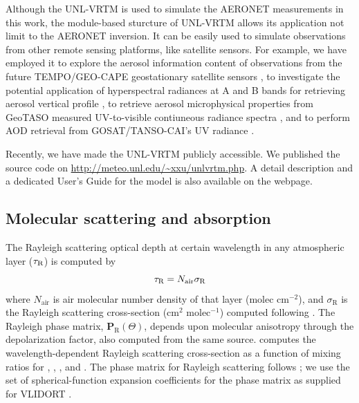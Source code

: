 Although the UNL-VRTM is used to simulate the AERONET measurements in
this work, the module-based sturcture of UNL-VRTM allows its application 
not limit to the AERONET inversion. 
It can be easily used to simulate observations
from other remote sensing platforms, like satellite sensors. For
example, we have employed it to explore the aerosol information content
of observations from the future TEMPO/GEO-CAPE geostationary satellite
sensors \citep{Wang14}, to investigate the potential application of
hyperspectral radiances at A and B bands for retrieving
aerosol vertical profile \citep{Wang14, Ding14}, to retrieve aerosol 
microphysical properties from GeoTASO measured UV-to-visible contiuneous 
radiance spectra \citep{Hou14}, and to perform AOD retrieval from 
GOSAT/TANSO-CAI's UV radiance \citep{Han14}. 

Recently, we have made the UNL-VRTM publicly accessible. We published
the source code on \url{http://meteo.unl.edu/~xxu/unlvrtm.php}. A
detail description and a dedicated User's Guide for the model is also 
available on the webpage.  

\subsection{Molecular scattering and absorption} \label{subsec:rayleigh}

The Rayleigh scattering optical depth at certain wavelength in any 
atmospheric layer ($\tau_\text{R}$) is computed by
\begin{equation}
\tau_\text{R} = N_\text{air}\sigma_\text{R} 
\end{equation}
where $N_\text{air}$ is air molecular number density of that layer
(molec cm$^{-2}$), and $\sigma_\text{R}$ is the Rayleigh scattering 
cross-section (cm$^2$ molec$^{-1}$) computed following
\citet{Bodhaine99}. The Rayleigh phase matrix,
$\mathbf{P}_\text{R}(\Theta)$, depends upon molecular 
anisotropy through the depolarization factor, also computed from the same 
source. \citet{Bodhaine99} computes the wavelength-dependent Rayleigh
scattering cross-section as a function of mixing ratios for ,
, , and . The phase matrix for Rayleigh scattering
follows \citet{Hansen74}; we use the set of spherical-function expansion
 coefficients for the phase matrix as supplied for VLIDORT
\citep{Spurr06}.

